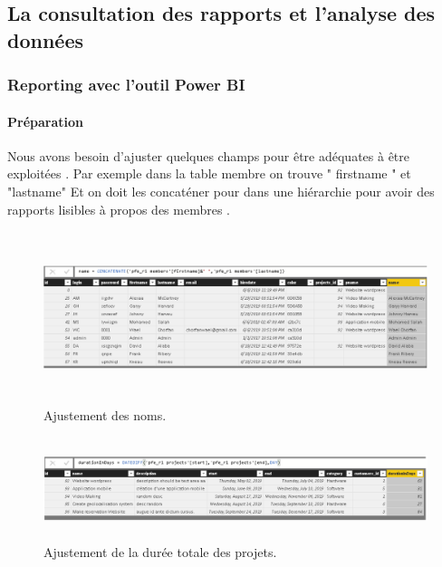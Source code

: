 \subsection{ La consultation des rapports et l'analyse des donn\'{e}es  }

\subsubsection{Reporting avec l'outil Power BI }


\paragraph{Pr\'{e}paration}
Nous avons besoin d'ajuster quelques champs pour \^{e}tre ad\'{e}quates \`{a} \^{e}tre
exploit\'{e}es . Par exemple dans la table membre on trouve " firstname " et
"lastname" Et on doit les concat\'{e}ner pour dans une hi\'{e}rarchie pour avoir
des rapports lisibles \`{a} propos des membres .





\begin{figure}[H]
\center
\includegraphics[width=14cm,height=5cm]{./figures/pb1.png}
\caption{Ajustement des noms.}
\end{figure}



\bigskip
\bigskip


\begin{figure}[H]
\center
\includegraphics[width=14cm,height=3cm]{./figures/pb2.png}
\caption{Ajustement de la dur\'{e}e totale des projets.}
\end{figure}


